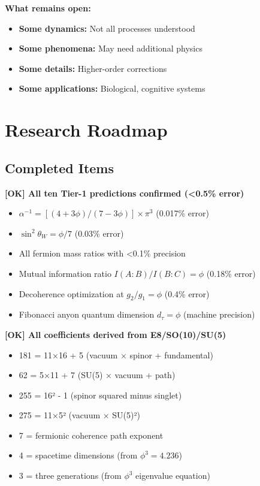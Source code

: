 \documentclass[11pt]{article}
\theoremstyle{definition}
\newcommand{\goldenratio}{\phi}
\newcommand{\fibonacci}{\tau}
\begin{document}
\textbf{What remains open:}
\begin{itemize}
\item \textbf{Some dynamics:} Not all processes understood
\item \textbf{Some phenomena:} May need additional physics
\item \textbf{Some details:} Higher-order corrections
\item \textbf{Some applications:} Biological, cognitive systems
\end{itemize}

\section{Research Roadmap}

\subsection{Completed Items}

\textbf{[OK] All ten Tier-1 predictions confirmed (<0.5\% error)}
\begin{itemize}
\item $\alpha^{-1} = [(4+3\goldenratio)/(7-3\goldenratio)]\times\pi^3$ (0.017\% error)
\item $\sin^2\theta_W = \goldenratio/7$ (0.03\% error)
\item All fermion mass ratios with <0.1\% precision
\item Mutual information ratio $I(A:B)/I(B:C) = \goldenratio$ (0.18\% error)
\item Decoherence optimization at $g_2/g_1 = \goldenratio$ (0.4\% error)
\item Fibonacci anyon quantum dimension $d_\fibonacci = \goldenratio$ (machine precision)
\end{itemize}

\textbf{[OK] All coefficients derived from E8/SO(10)/SU(5)}
\begin{itemize}
\item 181 = 11×16 + 5 (vacuum × spinor + fundamental)
\item 62 = 5×11 + 7 (SU(5) × vacuum + path)
\item 255 = 16² - 1 (spinor squared minus singlet)
\item 275 = 11×5² (vacuum × SU(5)²)
\item 7 = fermionic coherence path exponent
\item 4 = spacetime dimensions (from $\goldenratio^3 = 4.236$)
\item 3 = three generations (from $\goldenratio^3$ eigenvalue equation)
\end{itemize}
\end{document}
